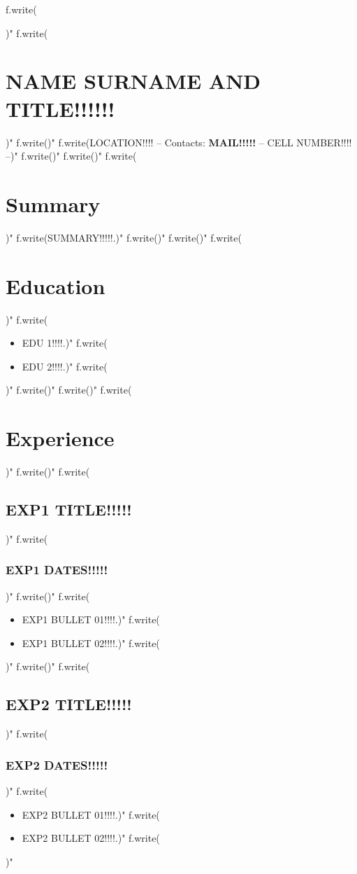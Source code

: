 f.write(\documentclass[a4paper, 9pt]{article})"
\begin{document}
)"
 f.write(\section*{NAME SURNAME AND TITLE!!!!!!})"
 f.write()"
 f.write(\small LOCATION!!!! -- Contacts: \textbf{MAIL!!!!!} -- CELL NUMBER!!!! --)"
 f.write()"
 f.write()"
 f.write(\section*{Summary})"
 f.write(SUMMARY!!!!!.)"
 f.write()"
 f.write()"
 f.write(\section*{Education})"
 f.write(\begin{itemize}[noitemsep])"
 f.write(\item EDU 1!!!!.)"
 f.write(\item EDU 2!!!!.)"
 f.write(\end{itemize})"
 f.write()"
 f.write()"
 f.write(\section*{Experience})"
 f.write()"
 f.write(\subsection*{EXP1 TITLE!!!!!})"
 f.write(\subsubsection*{EXP1 DATES!!!!!})"
 f.write()"
 f.write(\begin{itemize}[noitemsep])"
 f.write()"
 f.write(\item EXP1 BULLET 01!!!!.)"
 f.write(\item EXP1 BULLET 02!!!!.)"
 f.write(\end{itemize})"
 f.write()"
 f.write(\subsection*{EXP2 TITLE!!!!!})"
 f.write(\subsubsection*{EXP2 DATES!!!!!})"
 f.write(\begin{itemize}[noitemsep])"
 f.write(\item EXP2 BULLET 01!!!!.)"
 f.write(\item EXP2 BULLET 02!!!!.)"
 f.write(\end{itemize})"
\end{document}
